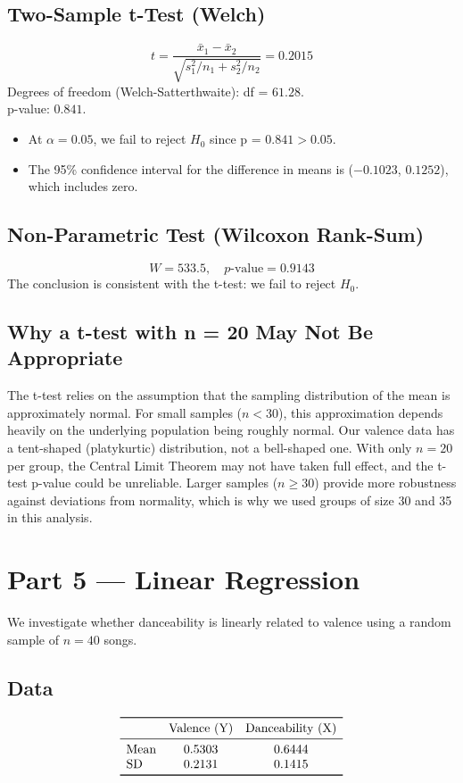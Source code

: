 \documentclass[12pt]{article}
\begin{document}
\subsection*{Two-Sample t-Test (Welch)}
\[
t = \frac{\bar{x}_1 - \bar{x}_2}{\sqrt{s_1^2/n_1 + s_2^2/n_2}} = 0.2015
\]
Degrees of freedom (Welch-Satterthwaite): df = $61.28$. \\
p-value: $0.841$.

\begin{itemize}
    \item At $\alpha = 0.05$, we fail to reject $H_0$ since p = $0.841 > 0.05$.
    \item The 95\% confidence interval for the difference in means is ($-0.1023$, $0.1252$), which includes zero.
\end{itemize}

\subsection*{Non-Parametric Test (Wilcoxon Rank-Sum)}
\[
W = 533.5, \quad p\text{-value} = 0.9143
\]
The conclusion is consistent with the t-test: we fail to reject $H_0$.

\subsection*{Why a t-test with n = 20 May Not Be Appropriate}
The t-test relies on the assumption that the sampling distribution of the mean is approximately normal. For small samples ($n < 30$), this approximation depends heavily on the underlying population being roughly normal. Our valence data has a tent-shaped (platykurtic) distribution, not a bell-shaped one. With only $n = 20$ per group, the Central Limit Theorem may not have taken full effect, and the t-test p-value could be unreliable. Larger samples ($n \geq 30$) provide more robustness against deviations from normality, which is why we used groups of size 30 and 35 in this analysis.

\section*{Part 5 — Linear Regression}

We investigate whether danceability is linearly related to valence using a random sample of $n = 40$ songs.

\subsection*{Data}
\[
\begin{array}{lcc}
    \toprule
    & \text{Valence (Y)} & \text{Danceability (X)} \\
    \midrule
    \text{Mean}   & 0.5303 & 0.6444 \\
    \text{SD}     & 0.2131 & 0.1415 \\
    \bottomrule
\end{array}
\]
\end{document}
